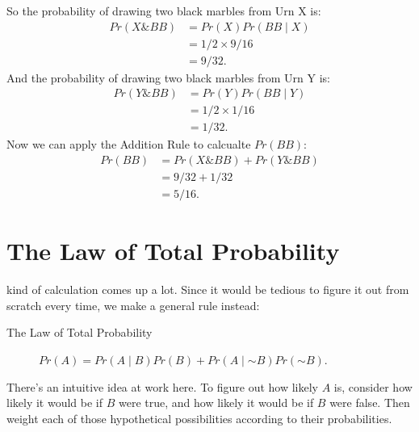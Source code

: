 \documentclass[justified]{tufte-book}
\newcommand{\given}{\mid}
\renewcommand{\neg}{\mathbin{\sim}}
\renewcommand{\wedge}{\mathbin{\&}}
\newcommand{\p}{Pr}
\theoremstyle{definition}
\theoremstyle{definition}
\theoremstyle{definition}
\theoremstyle{remark}
\begin{document}
So the probability of drawing two black marbles from Urn X is: \[
  \begin{aligned}
    \p(X \wedge BB) &= \p(X) \p(BB \given X)\\
                    &= 1/2 \times 9/16\\
                    &= 9/32.
  \end{aligned}
\] And the probability of drawing two black marbles from Urn Y is: \[
  \begin{aligned}
    \p(Y \wedge BB) &= \p(Y) \p(BB \given Y)\\
                    &= 1/2 \times 1/16\\
                    &= 1/32.
  \end{aligned}
\] Now we can apply the Addition Rule to calcualte \(\p(BB)\): \[
  \begin{aligned}
    \p(BB) &= \p(X \wedge BB) + \p(Y \wedge BB)\\
           &= 9/32 + 1/32\\
           &= 5/16.
  \end{aligned}
\]

\hypertarget{the-law-of-total-probability}{%
\section{The Law of Total
Probability}\label{the-law-of-total-probability}}

 kind of calculation comes up a lot. Since it would be
tedious to figure it out from scratch every time, we make a general rule
instead:

\begin{description}
\item[The Law of Total Probability]
\(\p(A) = \p(A \given B) \p(B) + \p(A \given \neg B) \p(\neg B)\).
\end{description}

There's an intuitive idea at work here. To figure out how likely \(A\)
is, consider how likely it would be if \(B\) were true, and how likely
it would be if \(B\) were false. Then weight each of those hypothetical
possibilities according to their probabilities.
\end{document}
